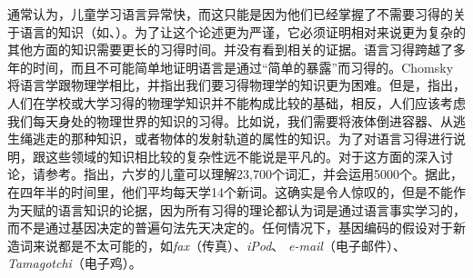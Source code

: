 通常认为，儿童学习语言异常快，而这只能是因为他们已经掌握了不需要习得的关于语言的知识（如\citealp[]{Chomsky76c-u}、\citealp[]{Hornstein2013a}）。为了让这个论述更为严谨，它必须证明相对来说更为复杂的其他方面的知识需要更长的习得时间\citep[--218]{Sampson89a}。并没有看到相关的证据。语言习得跨越了多年的时间，而且不可能简单地证明语言是通过“简单的暴露”而习得的。Chomsky将语言学跟物理学相比，并指出我们要习得物理学的知识更为困难。但是，\citet[]{Sampson89a}指出，人们在学校或大学习得的物理学知识并不能构成比较的基础，相反，人们应该考虑我们每天身处的物理世界的知识的习得。比如说，我们需要将液体倒进容器、从逃生绳逃走的那种知识，或者物体的发射轨道的属性的知识。为了对语言习得进行说明，跟这些领域的知识相比较的复杂性远不能说是平凡的。对于这方面的深入讨论，请参考。\citet[]{MR98a-u}指出，六岁的儿童可以理解23,700个词汇，并会运用5000个。据此，在四年半的时间里，他们平均每天学14个新词。这确实是令人惊叹的，但是不能作为天赋的语言知识的论据，因为所有习得的理论都认为词是通过语言事实学习的，而不是通过基因决定的普遍句法先天决定的。任何情况下，基因编码的假设对于新造词来说都是不太可能的，如\emph{fax}（传真）、\emph{iPod}、 \emph{e-mail}（电子邮件）、\emph{Tamagotchi}（电子鸡）。
